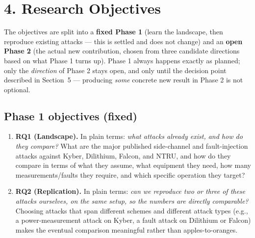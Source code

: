 \documentclass[11pt,a4paper]{article}
\begin{document}
\section*{4. Research Objectives}

The objectives are split into a \textbf{fixed Phase 1} (learn the landscape, then reproduce existing attacks --- this is settled and does not change) and an \textbf{open Phase 2} (the actual new contribution, chosen from three candidate directions based on what Phase 1 turns up). Phase 1 always happens exactly as planned; only the \emph{direction} of Phase 2 stays open, and only until the decision point described in Section~5 --- producing \emph{some} concrete new result in Phase 2 is not optional.

\subsection*{Phase 1 objectives (fixed)}
\begin{enumerate}[leftmargin=*]
  \item \textbf{RQ1 (Landscape).} In plain terms: \emph{what attacks already exist, and how do they compare?} What are the major published side-channel and fault-injection attacks against Kyber, Dilithium, Falcon, and NTRU, and how do they compare in terms of what they assume, what equipment they need, how many measurements/faults they require, and which specific operation they target?
  \item \textbf{RQ2 (Replication).} In plain terms: \emph{can we reproduce two or three of these attacks ourselves, on the same setup, so the numbers are directly comparable?} Choosing attacks that span different schemes and different attack types (e.g., a power-measurement attack on Kyber, a fault attack on Dilithium or Falcon) makes the eventual comparison meaningful rather than apples-to-oranges.
\end{enumerate}
\end{document}
